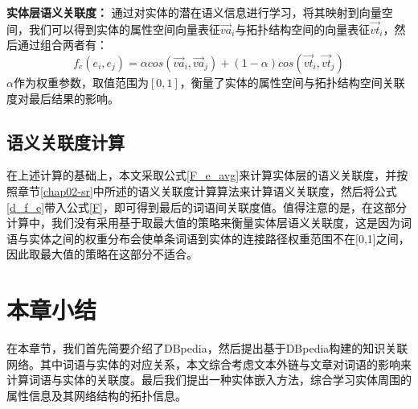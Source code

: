 \textbf{实体层语义关联度：}
通过对实体的潜在语义信息进行学习，将其映射到向量空间，我们可以得到实体的属性空间向量表征$\vec {va}_i$与拓扑结构空间的向量表征$\vec {vt}_i$，然后通过组合两者有：
\begin{equation}
    \label{d_f_e}
    f_e(e_i, e_j) = \alpha cos({\vec {va}_i, \vec {va}_j})
    + (1-\alpha)cos(\vec {vt}_i,\vec {vt}_j)
\end{equation}
\noindent $\alpha$作为权重参数，取值范围为$[0,1]$，衡量了实体的属性空间与拓扑结构空间关联度对最后结果的影响。

\subsection{语义关联度计算}
在上述计算的基础上，本文采取公式\ref{F_e_avg}来计算实体层的语义关联度，并按照章节\ref{chap02-sr}中所述的语义关联度计算算法来计算语义关联度，然后将公式\ref{d_f_e}带入公式\ref{F}，即可得到最后的词语间关联度值。值得注意的是，在这部分计算中，我们没有采用基于取最大值的策略来衡量实体层语义关联度，这是因为词语与实体之间的权重分布会使单条词语到实体的连接路径权重范围不在[0,1]之间，因此取最大值的策略在这部分不适合。

\section{本章小结}

在本章节，我们首先简要介绍了DBpedia，然后提出基于DBpedia构建的知识关联网络。其中词语与实体的对应关系，本文综合考虑文本外链与文章对词语的影响来计算词语与实体的关联度。最后我们提出一种实体嵌入方法，综合学习实体周围的属性信息及其网络结构的拓扑信息。
